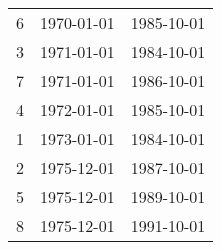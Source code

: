 % 
\begin{tabular}{ccc}
  \hline
  \hline
6 & 1970-01-01 & 1985-10-01 \\ 
  3 & 1971-01-01 & 1984-10-01 \\ 
  7 & 1971-01-01 & 1986-10-01 \\ 
  4 & 1972-01-01 & 1985-10-01 \\ 
  1 & 1973-01-01 & 1984-10-01 \\ 
  2 & 1975-12-01 & 1987-10-01 \\ 
  5 & 1975-12-01 & 1989-10-01 \\ 
  8 & 1975-12-01 & 1991-10-01 \\ 
   \hline
\end{tabular}
